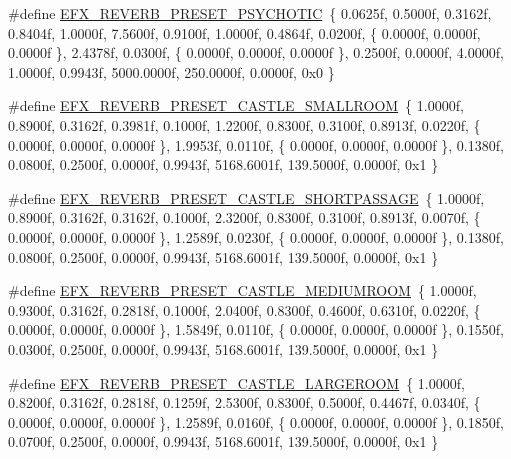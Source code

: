 \begin{DoxyCompactItemize}
\#define \mbox{\hyperlink{efx-presets_8h_ad8163f43e1716894be621dcd79d54d2c}{E\+F\+X\+\_\+\+R\+E\+V\+E\+R\+B\+\_\+\+P\+R\+E\+S\+E\+T\+\_\+\+P\+S\+Y\+C\+H\+O\+T\+IC}}~\{ 0.\+0625f, 0.\+5000f, 0.\+3162f, 0.\+8404f, 1.\+0000f, 7.\+5600f, 0.\+9100f, 1.\+0000f, 0.\+4864f, 0.\+0200f, \{ 0.\+0000f, 0.\+0000f, 0.\+0000f \}, 2.\+4378f, 0.\+0300f, \{ 0.\+0000f, 0.\+0000f, 0.\+0000f \}, 0.\+2500f, 0.\+0000f, 4.\+0000f, 1.\+0000f, 0.\+9943f, 5000.\+0000f, 250.\+0000f, 0.\+0000f, 0x0 \}
\item 
\#define \mbox{\hyperlink{efx-presets_8h_a9e21af4806035fc51af8fe4afadd1189}{E\+F\+X\+\_\+\+R\+E\+V\+E\+R\+B\+\_\+\+P\+R\+E\+S\+E\+T\+\_\+\+C\+A\+S\+T\+L\+E\+\_\+\+S\+M\+A\+L\+L\+R\+O\+OM}}~\{ 1.\+0000f, 0.\+8900f, 0.\+3162f, 0.\+3981f, 0.\+1000f, 1.\+2200f, 0.\+8300f, 0.\+3100f, 0.\+8913f, 0.\+0220f, \{ 0.\+0000f, 0.\+0000f, 0.\+0000f \}, 1.\+9953f, 0.\+0110f, \{ 0.\+0000f, 0.\+0000f, 0.\+0000f \}, 0.\+1380f, 0.\+0800f, 0.\+2500f, 0.\+0000f, 0.\+9943f, 5168.\+6001f, 139.\+5000f, 0.\+0000f, 0x1 \}
\item 
\#define \mbox{\hyperlink{efx-presets_8h_a2bdb9324de8ff86ae224937cca35a78e}{E\+F\+X\+\_\+\+R\+E\+V\+E\+R\+B\+\_\+\+P\+R\+E\+S\+E\+T\+\_\+\+C\+A\+S\+T\+L\+E\+\_\+\+S\+H\+O\+R\+T\+P\+A\+S\+S\+A\+GE}}~\{ 1.\+0000f, 0.\+8900f, 0.\+3162f, 0.\+3162f, 0.\+1000f, 2.\+3200f, 0.\+8300f, 0.\+3100f, 0.\+8913f, 0.\+0070f, \{ 0.\+0000f, 0.\+0000f, 0.\+0000f \}, 1.\+2589f, 0.\+0230f, \{ 0.\+0000f, 0.\+0000f, 0.\+0000f \}, 0.\+1380f, 0.\+0800f, 0.\+2500f, 0.\+0000f, 0.\+9943f, 5168.\+6001f, 139.\+5000f, 0.\+0000f, 0x1 \}
\item 
\#define \mbox{\hyperlink{efx-presets_8h_a05f6c31dbfd01ed6ecaf580a5772a506}{E\+F\+X\+\_\+\+R\+E\+V\+E\+R\+B\+\_\+\+P\+R\+E\+S\+E\+T\+\_\+\+C\+A\+S\+T\+L\+E\+\_\+\+M\+E\+D\+I\+U\+M\+R\+O\+OM}}~\{ 1.\+0000f, 0.\+9300f, 0.\+3162f, 0.\+2818f, 0.\+1000f, 2.\+0400f, 0.\+8300f, 0.\+4600f, 0.\+6310f, 0.\+0220f, \{ 0.\+0000f, 0.\+0000f, 0.\+0000f \}, 1.\+5849f, 0.\+0110f, \{ 0.\+0000f, 0.\+0000f, 0.\+0000f \}, 0.\+1550f, 0.\+0300f, 0.\+2500f, 0.\+0000f, 0.\+9943f, 5168.\+6001f, 139.\+5000f, 0.\+0000f, 0x1 \}
\item 
\#define \mbox{\hyperlink{efx-presets_8h_a2cbeb7be51ded88e22bd3fc898c26dfe}{E\+F\+X\+\_\+\+R\+E\+V\+E\+R\+B\+\_\+\+P\+R\+E\+S\+E\+T\+\_\+\+C\+A\+S\+T\+L\+E\+\_\+\+L\+A\+R\+G\+E\+R\+O\+OM}}~\{ 1.\+0000f, 0.\+8200f, 0.\+3162f, 0.\+2818f, 0.\+1259f, 2.\+5300f, 0.\+8300f, 0.\+5000f, 0.\+4467f, 0.\+0340f, \{ 0.\+0000f, 0.\+0000f, 0.\+0000f \}, 1.\+2589f, 0.\+0160f, \{ 0.\+0000f, 0.\+0000f, 0.\+0000f \}, 0.\+1850f, 0.\+0700f, 0.\+2500f, 0.\+0000f, 0.\+9943f, 5168.\+6001f, 139.\+5000f, 0.\+0000f, 0x1 \}

\end{DoxyCompactItemize}
